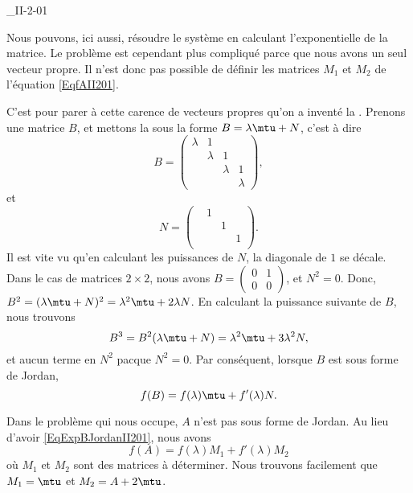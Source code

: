 \begin{corrige}{_II-2-01}
\begin{enumerate}
\begin{alternative}
	Nous pouvons, ici aussi, résoudre le système en calculant l'exponentielle de la matrice. Le problème est cependant plus compliqué parce que nous avons un seul vecteur propre. Il n'est donc pas possible de définir les matrices $M_1$ et $M_2$ de l'équation \eqref{EqfAII201}.

	C'est pour parer à cette carence de vecteurs propres qu'on a inventé la . Prenons une matrice $B$, et mettons la sous la forme $B=\lambda\mtu+N$, c'est à dire
\begin{equation}
	B=\begin{pmatrix}
 \lambda	&	1	&		&		\\ 
 	&	\lambda	&	1	&		\\ 
 	&		&	\lambda	&	1	\\ 
	&		&		&	\lambda	 
 \end{pmatrix},
\end{equation}
et 
\begin{equation}
	N=\begin{pmatrix}
 	&	1	&		&		\\ 
 	&		&	1	&		\\ 
 	&		&		&	1	\\ 
	&		&		&		 
 \end{pmatrix}.
\end{equation}
Il est vite vu qu'en calculant les puissances de $N$, la diagonale de $1$ se décale. Dans le cas de matrices $2\times 2$, nous avons $B=\begin{pmatrix}
	0	&	1	\\ 
	0	&	0	
\end{pmatrix}$, et $N^2=0$. Donc, $B^2=(\lambda\mtu+N)^2=\lambda^2\mtu+2\lambda N$. En calculant la puissance suivante de $B$, nous trouvons
\begin{equation}
	B^3=B^2(\lambda\mtu+N)=\lambda^2\mtu+3\lambda^2N,
\end{equation}
et aucun terme en $N^2$ pacque $N^2=0$. Par conséquent, lorsque $B$ est sous forme de Jordan,
\begin{equation}		\label{EqExpBJordanII201}
	f(B)=f(\lambda)\mtu+f'(\lambda)N.
\end{equation}

Dans le problème qui nous occupe, $A$ n'est pas sous forme de Jordan. Au lieu d'avoir \eqref{EqExpBJordanII201}, nous avons
\begin{equation}
	f(A)=f(\lambda)M_1+f'(\lambda)M_2
\end{equation}
où $M_1$ et $M_2$ sont des matrices à déterminer. Nous trouvons facilement que $M_1=\mtu$ et $M_2=A+2\mtu$.



\end{alternative}
\end{enumerate}
\end{corrige}
